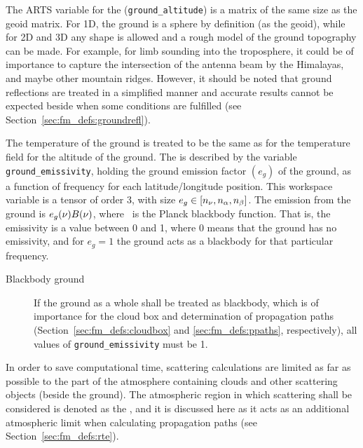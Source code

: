 The ARTS variable for the 
(\verb|ground_altitude|) is a matrix of the same size as the geoid
matrix. For 1D, the ground is a sphere by definition (as the geoid),
while for 2D and 3D any shape is allowed and a rough model of the
ground topography can be made. For example, for limb sounding into the
troposphere, it could be of importance to capture the intersection of
the antenna beam by the Himalayas, and maybe other mountain ridges.
However, it should be noted that ground reflections are treated in a
simplified manner and accurate results cannot be expected beside when
some conditions are fulfilled (see
Section~\ref{sec:fm_defs:groundrefl}).

The temperature of the ground is treated to
be the same as for the temperature field for the altitude of the
ground. The  is described by the variable
\verb|ground_emissivity|, holding the ground emission factor $(e_g)$
of the ground, as a function of frequency for each latitude/longitude
position. This workspace variable is a tensor of order 3, with
size $e_g \in [n_{\nu},n_{\alpha},n_{\beta}]$.
The emission from the ground is $e_g(\nu)B(\nu)$, where
\Planck\ is the Planck blackbody function. That is, the emissivity is
a value between 0 and 1, where 0 means that the ground has no
emissivity, and for $e_g=1$ the ground acts as a blackbody for that
particular frequency. 

\begin{description}
\item[Blackbody ground] If the ground as a
  whole shall be treated as blackbody, which is of importance for the
  cloud box and determination of propagation paths
  (Section~\ref{sec:fm_defs:cloudbox} and \ref{sec:fm_defs:ppaths},
  respectively), all values of \verb|ground_emissivity| must be 1.
\end{description}


\label{sec:fm_defs:cloudbox}

In order to save computational time, scattering calculations are
limited as far as possible to the part of the atmosphere containing
clouds and other scattering objects (beside the ground). The
atmospheric region in which scattering shall be considered is denoted
as the , and it is discussed here as it acts as an
additional atmospheric limit when calculating propagation paths (see
Section~\ref{sec:fm_defs:rte}).

